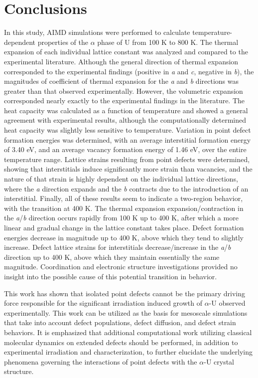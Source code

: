 \documentclass[utf8]{frontiersSCNS} %
\providecommand{\DIFaddbegin}{\protect\color{blue}} %
\providecommand{\DIFaddend}{\protect\color{black}} %
\begin{document}
\DIFaddbegin \FloatBarrier

\DIFaddend \section{Conclusions}

In this study, AIMD simulations were performed to calculate temperature-dependent properties of the $\alpha$ phase of U from 100 K to 800 K. The thermal expansion of each individual lattice constant was analyzed and compared to the experimental literature. Although the general direction of thermal expansion corresponded to the experimental findings (positive in \textit{a} and \textit{c}, negative in \textit{b}), the magnitudes of coefficient of thermal expansion for the \textit{a} and \textit{b} directions was greater than that observed experimentally. However, the volumetric expansion corresponded nearly exactly to the experimental findings in the literature. The heat capacity was calculated as a function of temperature and showed a general agreement with experimental results, although the computationally determined heat capacity was slightly less sensitive to temperature. Variation in point defect formation energies was determined, with an average interstitial formation energy of 3.40 eV, and an average vacancy formation energy of 1.46 eV, over the entire temperature range. Lattice strains resulting from point defects were determined, showing that interstitials induce significantly more strain than vacancies, and the nature of that strain is highly dependent on the individual lattice directions, where the \textit{a} direction expands and the \textit{b} contracts due to the introduction of an interstitial. Finally, all of these results seem to indicate a two-region behavior, with the transition at 400 K. The thermal expansion expansion/contraction in the \textit{a}/\textit{b} direction occurs rapidly from 100 K up to 400 K, after which a more linear and gradual change in the lattice constant takes place. Defect formation energies decrease in magnitude up to 400 K, above which they tend to slightly increase. Defect lattice strains for interstitials decrease/increase in the \textit{a}/\textit{b} direction up to 400 K, above which they maintain essentially the same magnitude. Coordination and electronic structure investigations provided no insight into the possible cause of this potential transition in behavior. 

This work has shown that isolated point defects cannot be the primary driving force responsible for the significant irradiation induced growth of $\alpha$-U observed experimentally. This work can be utilized as the basis for mesoscale simulations that take into account defect populations, defect diffusion, and defect strain behaviors. It is emphasized that additional computational work utilizing classical molecular dynamics on extended defects should be performed, in addition to experimental irradiation and characterization, to further elucidate the underlying phenomena governing the interactions of point defects with the $\alpha$-U crystal structure. 
\end{document}
